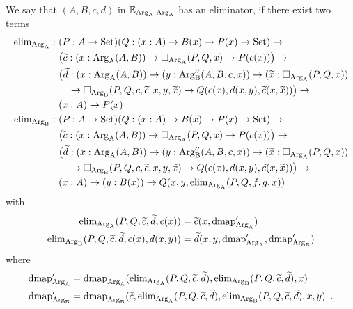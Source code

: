 \documentclass[orivec,envcountsame, ,envcountsect]{llncs}
\begin{document}
\begin{definition}
  We say that $(A, B, c, d)$ in $\mathbb{E}_{\text{Arg}_{\text{A}}, \text{Arg}_{\text{A}}}$ has an
  eliminator, if there exist two terms 
\begin{align*}
  \text{elim}_{\text{Arg}_{\text{A}}} :\ & (P : A \to \text{Set})(Q : (x : A) \to B(x) \to P(x) \to \text{Set}) \to \\
  & \big(\widetilde{c} : (x : \text{Arg}_{\text{A}}(A, B)) \to \Box_{\text{Arg}_{\text{A}}}(P, Q, x) \to P(c(x))\big) \to \\
  & \big(\widetilde{d} : (x : \text{Arg}_{\text{A}}(A, B)) \to (y : \text{Arg}_{\text{B}}''(A, B, c, x)) \to
  (\widetilde{x} : \Box_{\text{Arg}_{\text{A}}}(P, Q, x))  \\
  & \quad \to  \Box_{\text{Arg}_{\text{B}}}(P, Q, c, \widetilde{c}, x, y, \widetilde{x}) \to 
     Q(c(x), d(x, y), \widetilde{c}(x, \widetilde{x}))\big) \to \\
  & (x : A) \to P(x) \\
  \text{elim}_{\text{Arg}_{\text{B}}} :\ & (P : A \to \text{Set})(Q : (x : A) \to B(x) \to P(x) \to \text{Set}) \to \\
  & \big(\widetilde{c} : (x : \text{Arg}_{\text{A}}(A, B)) \to \Box_{\text{Arg}_{\text{A}}}(P, Q, x) \to P(c(x))\big) \to \\
  & \big(\widetilde{d} : (x : \text{Arg}_{\text{A}}(A, B)) \to (y : \text{Arg}_{\text{B}}''(A, B, c, x)) \to
  (\widetilde{x} : \Box_{\text{Arg}_{\text{A}}}(P, Q, x))  \\
  & \quad \to  \Box_{\text{Arg}_{\text{B}}}(P, Q, c, \widetilde{c}, x, y, \widetilde{x}) \to 
     Q(c(x), d(x, y), \widetilde{c}(x, \widetilde{x}))\big) \to \\
  & (x : A) \to (y : B(x)) \to Q(x, y, \text{elim}_{\text{Arg}_{\text{A}}}(P, Q, f, g, x))
\end{align*}
with 
\begin{align*}
\text{elim}_{\text{Arg}_{\text{A}}}(P, Q, \widetilde{c}, \widetilde{d}, c(x)) &= \widetilde{c}(x, \text{dmap}_{\text{Arg}_{\text{A}}}') \\
 \text{elim}_{\text{Arg}_{\text{B}}}(P, Q, \widetilde{c}, \widetilde{d}, c(x), d(x, y)) &=
 \widetilde{d}(x, y, \text{dmap}_{\text{Arg}_{\text{A}}}',  \text{dmap}_{\text{Arg}_{\text{B}}}')
\end{align*}
where 
\begin{align*}
\text{dmap}_{\text{Arg}_{\text{A}}}' &= \text{dmap}_{\text{Arg}_{\text{A}}}(\text{elim}_{\text{Arg}_{\text{A}}}(P, Q, \widetilde{c}, \widetilde{d}), \text{elim}_{\text{Arg}_{\text{B}}}(P, Q, \widetilde{c}, \widetilde{d}), x) \\
\text{dmap}_{\text{Arg}_{\text{B}}}' &= \text{dmap}_{\text{Arg}_{\text{B}}}(\widetilde{c}, \text{elim}_{\text{Arg}_{\text{A}}}(P, Q, \widetilde{c}, \widetilde{d}), \text{elim}_{\text{Arg}_{\text{B}}}(P, Q, \widetilde{c}, \widetilde{d}), x, y) \enspace .
\end{align*}

\end{definition}
\end{document}
